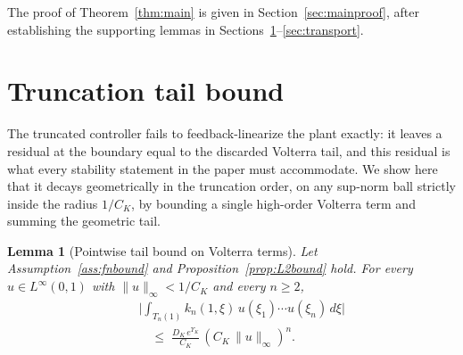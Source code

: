 \documentclass[10pt,a4paper]{amsart}
\newtheorem{lemma}{Lemma}
\newcommand{\Linf}{L^\infty}
\begin{document}
The proof of Theorem~\ref{thm:main} is given in Section~\ref{sec:mainproof}, after establishing the supporting lemmas in Sections~\ref{sec:tail}--\ref{sec:transport}.

\section{Truncation tail bound}\label{sec:tail}

The truncated controller fails to feedback-linearize the plant exactly: it leaves a residual at the boundary equal to the discarded Volterra tail, and this residual is what every stability statement in the paper must accommodate. We show here that it decays geometrically in the truncation order, on any sup-norm ball strictly inside the radius $1/C_K$, by bounding a single high-order Volterra term and summing the geometric tail.

\begin{lemma}[Pointwise tail bound on Volterra terms]\label{lem:pointwise_tail}
Let Assumption~\ref{ass:fnbound} and Proposition~\ref{prop:L2bound} hold. For every $u \in \Linf(0,1)$ with $\|u\|_\infty < 1/C_K$ and every $n \ge 2$,
\begin{eqnarray}
&& \biggl|\int_{T_n(1)} k_n(1,\xi)\, u(\xi_1)\cdots u(\xi_n)\, d\xi\biggr| \nonumber \\
&& \quad \le\; \frac{D_K\, e^{\Upsilon_K}}{C_K}\,(C_K\,\|u\|_\infty)^n.
\label{eq:pointwise_tail}
\end{eqnarray}
\end{lemma}
\end{document}

